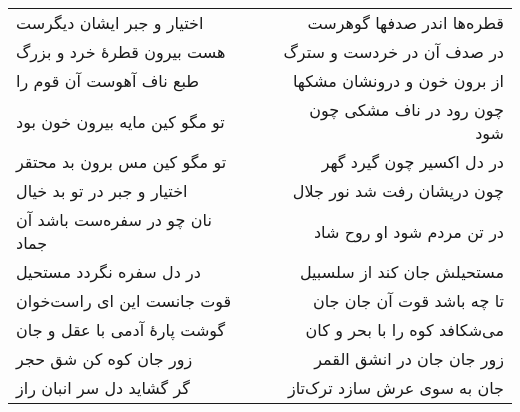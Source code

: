 \begin{center}
\begin{longtable}{l p{0.5cm} r}
\\
اختیار و جبر ایشان دیگرست
&&
قطره‌ها اندر صدفها گوهرست
\\
هست بیرون قطرهٔ خرد و بزرگ
&&
در صدف آن در خردست و سترگ
\\
طبع ناف آهوست آن قوم را
&&
از برون خون و درونشان مشکها
\\
تو مگو کین مایه بیرون خون بود
&&
چون رود در ناف مشکی چون شود
\\
تو مگو کین مس برون بد محتقر
&&
در دل اکسیر چون گیرد گهر
\\
اختیار و جبر در تو بد خیال
&&
چون دریشان رفت شد نور جلال
\\
نان چو در سفره‌ست باشد آن جماد
&&
در تن مردم شود او روح شاد
\\
در دل سفره نگردد مستحیل
&&
مستحیلش جان کند از سلسبیل
\\
قوت جانست این ای راست‌خوان
&&
تا چه باشد قوت آن جان جان
\\
گوشت پارهٔ آدمی با عقل و جان
&&
می‌شکافد کوه را با بحر و کان
\\
زور جان کوه کن شق حجر
&&
زور جان جان در انشق القمر
\\
گر گشاید دل سر انبان راز
&&
جان به سوی عرش سازد ترک‌تاز
\\
\end{longtable}
\end{center}
